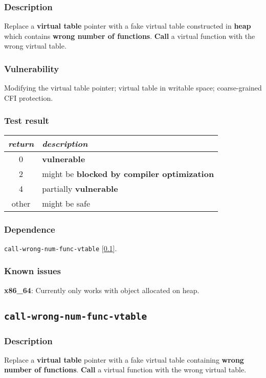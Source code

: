 \documentclass[a4paper]{book}
\begin{document}
\subsubsection{Description}
Replace a \textbf{virtual table} pointer with a fake virtual table constructed in \textbf{heap} which contains \textbf{wrong number of functions}.
\textbf{Call} a virtual function with the wrong virtual table.

\subsubsection{Vulnerability}
Modifying the virtual table pointer; virtual table in writable space; coarse-grained CFI protection.

\subsubsection{Test result}
\begin{tabular}{cl}
  \toprule
  \emph{return}  & \emph{description} \\
  \midrule
  0              & \textbf{vulnerable} \\
  2              & might be \textbf{blocked by compiler optimization} \\
  4              & partially \textbf{vulnerable} \\
  other          & might be safe \\
  \bottomrule
\end{tabular}

\subsubsection{Dependence}

\texttt{call-wrong-num-func-vtable} [\ref{test-call-wrong-num-func-vtable}].

\subsubsection{Known issues}

\textbf{x86\_64}: Currently only works with object allocated on heap.

\newpage
\subsection{\texttt{call-wrong-num-func-vtable}}\label{test-call-wrong-num-func-vtable}

\subsubsection{Description}
Replace a \textbf{virtual table} pointer with a fake virtual table containing \textbf{wrong number of functions}.
\textbf{Call} a virtual function with the wrong virtual table.
\end{document}
